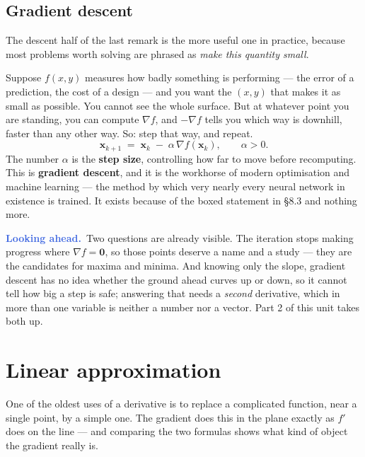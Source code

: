 \documentclass[11pt]{article}
\theoremstyle{plain}
\theoremstyle{definition}
\theoremstyle{remark}
\newcommand{\lookahead}{\par\smallskip\noindent
  \textbf{\sffamily\textcolor{RoyalBlue}{Looking ahead.}}\ \ignorespaces}
\newcommand{\vc}[1]{\mathbf{#1}}
\newcommand{\grad}{\nabla}
\begin{document}
\subsection{Gradient descent}
The descent half of the last remark is the more useful one in practice, because
most problems worth solving are phrased as \emph{make this quantity small}.

Suppose $f(x,y)$ measures how badly something is performing --- the error of a
prediction, the cost of a design --- and you want the $(x,y)$ that makes it as
small as possible. You cannot see the whole surface. But at whatever point you
are standing, you can compute $\grad f$, and $-\grad f$ tells you which way is
downhill, faster than any other way. So: step that way, and repeat.
\[
  \vc{x}_{k+1} \;=\; \vc{x}_{k} \;-\; \alpha\,\grad f(\vc{x}_k),
  \qquad \alpha>0 .
\]
The number $\alpha$ is the \textbf{step size}, controlling how far to move
before recomputing. This is \textbf{gradient descent}, and it is the workhorse
of modern optimisation and machine learning --- the method by which very nearly
every neural network in existence is trained. It exists because of the boxed
statement in \S8.3 and nothing more.

\lookahead Two questions are already visible. The iteration stops making
progress where $\grad f=\vc{0}$, so those points deserve a name and a study ---
they are the candidates for maxima and minima. And knowing only the slope,
gradient descent has no idea whether the ground ahead curves up or down, so it
cannot tell how big a step is safe; answering that needs a \emph{second}
derivative, which in more than one variable is neither a number nor a vector.
Part 2 of this unit takes both up.

\section{Linear approximation}
One of the oldest uses of a derivative is to replace a complicated function, near
a single point, by a simple one. The gradient does this in the plane exactly as
$f'$ does on the line --- and comparing the two formulas shows what kind of
object the gradient really is.
\end{document}
